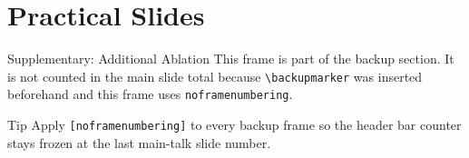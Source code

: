 \documentclass[aspectratio=169]{beamer}
\begin{document}

\section{Practical Slides}


\closingframe


\backupmarker



\begin{frame}[noframenumbering]{Supplementary: Additional Ablation}
  This frame is part of the backup section. It is not counted in the
  main slide total because \texttt{\textbackslash backupmarker} was
  inserted beforehand and this frame uses \texttt{noframenumbering}.

  \begin{block}{Tip}
    Apply \texttt{[noframenumbering]} to every backup frame so the
    header bar counter stays frozen at the last main-talk slide number.
  \end{block}
\end{frame}
\end{document}
